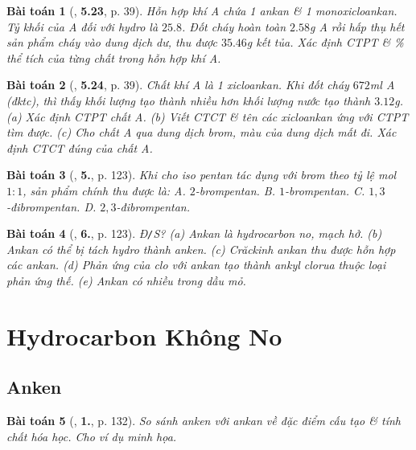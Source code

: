 \documentclass{article}
\numberwithin{equation}{section}
\newtheorem{baitoan}{Bài toán}[section]
\begin{document}
\begin{baitoan}[\cite{SBT_Hoa_Hoc_11_co_ban}, \textbf{5.23}, p. 39]
	Hỗn hợp khí A chứa 1 ankan \& 1 monoxicloankan. Tỷ khối của A đối với hydro là $25.8$. Đốt cháy hoàn toàn $2.58$\emph{g} A rồi hấp thụ hết sản phẩm cháy vào dung dịch \emph{} dư, thu được $35.46$\emph{g} kết tủa. Xác định CTPT \& \% thể tích của từng chất trong hỗn hợp khí A.
\end{baitoan}

\begin{baitoan}[\cite{SBT_Hoa_Hoc_11_co_ban}, \textbf{5.24}, p. 39]
	Chất khí A là 1 xicloankan. Khi đốt cháy $672$\emph{ml} A (đktc), thì thấy khối lượng \emph{} tạo thành nhiều hơn khối lượng nước tạo thành $3.12$\emph{g}. (a) Xác định CTPT chất A. (b) Viết CTCT \& tên các xicloankan ứng với CTPT tìm được. (c) Cho chất A qua dung dịch brom, màu của dung dịch mất đi. Xác định CTCT đúng của chất A.
\end{baitoan}

\begin{baitoan}[\cite{SGK_Hoa_Hoc_11_co_ban}, \textbf{5.}, p. 123]
	Khi cho iso pentan tác dụng với brom theo tỷ lệ mol $1:1$, sản phẩm chính thu được là: {\sf A.} $2$-brompentan. {\sf B.} $1$-brompentan. {\sf C.} $1,3$-đibrompentan. {\sf D.} $2,3$-đibrompentan.
\end{baitoan}

\begin{baitoan}[\cite{SGK_Hoa_Hoc_11_co_ban}, \textbf{6.}, p. 123]
	\emph{Đ\texttt{/}S?} (a) Ankan là hydrocarbon no, mạch hở. (b) Ankan có thể bị tách hydro thành anken. (c) Crăckinh ankan thu được hỗn hợp các ankan. (d) Phản ứng của clo với ankan tạo thành ankyl clorua thuộc loại phản ứng thế. (e) Ankan có nhiều trong dầu mỏ.
\end{baitoan}


\section{Hydrocarbon Không No}

\subsection{Anken}

\begin{baitoan}[\cite{SGK_Hoa_Hoc_11_co_ban}, \textbf{1.}, p. 132]
	So sánh anken với ankan về đặc điểm cấu tạo \& tính chất hóa học. Cho ví dụ minh họa.
\end{baitoan}
\end{document}
